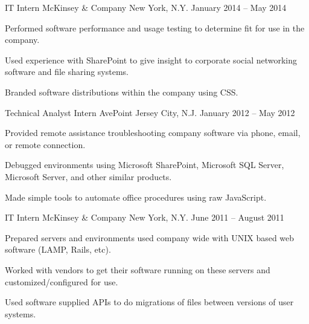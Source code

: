 \begin{cventries}
  \cventry
    {IT Intern} %
    {McKinsey \& Company} %
    {New York, N.Y.} %
    {January 2014 – May 2014} %
    {
      \begin{cvitems} %
        \item {Performed software performance and usage testing to determine fit for use in the company.}
        \item {Used experience with SharePoint to give insight to corporate social networking software and file sharing systems.}
        \item {Branded software distributions within the company using CSS.}
      \end{cvitems}
    }

  \cventry
    {Technical Analyst Intern} %
    {AvePoint} %
    {Jersey City, N.J.} %
    {January 2012 – May 2012} %
    {
      \begin{cvitems} %
        \item {Provided remote assistance troubleshooting company software via phone, email, or remote connection.}
        \item {Debugged environments using Microsoft SharePoint, Microsoft SQL Server, Microsoft Server, and other similar products.}
        \item {Made simple tools to automate office procedures using raw JavaScript.}
      \end{cvitems}
    }

  \cventry
    {IT Intern} %
    {McKinsey \& Company} %
    {New York, N.Y.} %
    {June 2011 – August 2011} %
    {
      \begin{cvitems} %
        \item {Prepared servers and environments used company wide with UNIX based web software (LAMP, Rails, etc).}
        \item {Worked with vendors to get their software running on these servers and customized/configured for use.}
        \item {Used software supplied APIs to do migrations of files between versions of user systems.}
      \end{cvitems}
    }

\end{cventries}
